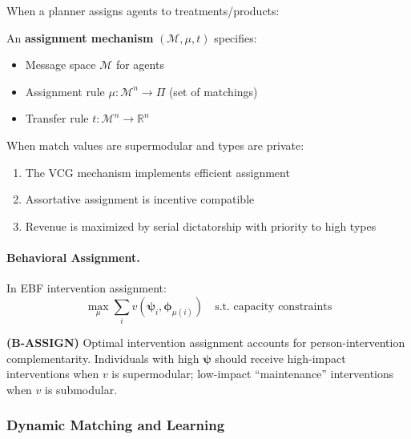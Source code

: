 When a planner assigns agents to treatments/products:

\begin{definition}
\label{def:assignment}
An \textbf{assignment mechanism} $(\mathcal{M}, \mu, t)$ specifies:
\begin{itemize}
    \item Message space $\mathcal{M}$ for agents
    \item Assignment rule $\mu: \mathcal{M}^n \to \Pi$ (set of matchings)
    \item Transfer rule $t: \mathcal{M}^n \to \mathbb{R}^n$
\end{itemize}
\end{definition}

\begin{theorem}
\label{thm:optimal-assign}
When match values are supermodular and types are private:
\begin{enumerate}
    \item The VCG mechanism implements efficient assignment
    \item Assortative assignment is incentive compatible
    \item Revenue is maximized by serial dictatorship with priority to high types
\end{enumerate}
\end{theorem}

\paragraph{Behavioral Assignment.}

In EBF intervention assignment:
\begin{equation}
\max_{\mu} \sum_{i} v(\boldsymbol{\psi}_i, \boldsymbol{\phi}_{\mu(i)})
\quad \text{s.t. capacity constraints}
\end{equation}

\begin{axiom}
\label{ax:B-ASSIGN}
\textbf{(B-ASSIGN)} Optimal intervention assignment accounts for person-intervention 
complementarity. Individuals with high $\boldsymbol{\psi}$ should receive 
high-impact interventions when $v$ is supermodular; low-impact ``maintenance'' 
interventions when $v$ is submodular.
\end{axiom}

\subsubsection{Dynamic Matching and Learning}

